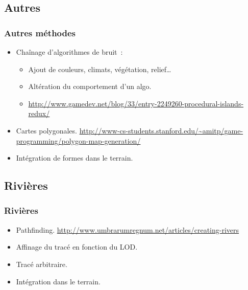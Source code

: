 \documentclass[hyperref={pdfpagelabels=false}]{beamer}
\begin{document}
\subsection{Autres}
\begin{frame}
  \frametitle{Autres méthodes}
  \begin{itemize}
  \item<1-> Chaînage d'algorithmes de bruit~:
    \begin{itemize}
    \item Ajout de couleurs, climats, végétation, relief\dots{}
    \item Altération du comportement d'un algo.
    \item[] {\tiny\url{http://www.gamedev.net/blog/33/entry-2249260-procedural-islands-redux/}}
    \end{itemize}
  \item<2-> Cartes polygonales. {\tiny\url{http://www-cs-students.stanford.edu/~amitp/game-programming/polygon-map-generation/}}
  \item<3-> Intégration de formes dans le terrain.
  \end{itemize}
\end{frame}

\subsection{Rivières}

\begin{frame}
  \frametitle{Rivières}
  \begin{itemize}
  \item<1-> Pathfinding. {\tiny\url{http://www.umbrarumregnum.net/articles/creating-rivers}}
  \item<2-> Affinage du tracé en fonction du LOD.
  \item<3-> Tracé arbitraire.
  \item<4-> Intégration dans le terrain.
  \end{itemize}
\end{frame}
\end{document}
